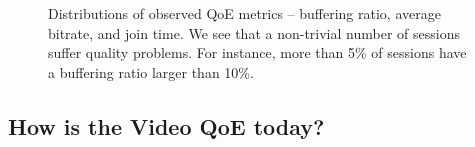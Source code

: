 \begin{figure}[th]
\centering
\captionsetup[subfigure]{justification=centering,farskip=-1pt,captionskip=5pt}
\caption{Distributions of observed QoE metrics -- 
buffering ratio, average bitrate, and join time. 
 We see that a non-trivial number of sessions suffer quality problems. 
 For instance, more than 5\% of sessions have a buffering ratio larger
  than 10\%.  }
\label{fig:overview:qualitycdf}
\end{figure}


\subsection{How is the Video QoE today?}
\label{subsec:measurement:video:today}


